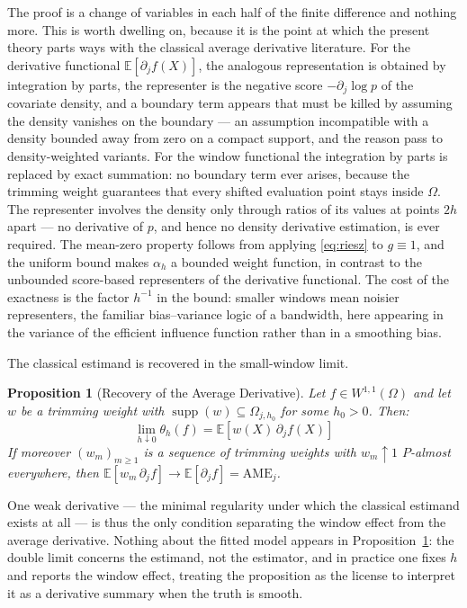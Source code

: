 \documentclass[12pt]{article}
\newtheorem{proposition}{Proposition}
\newcommand{\E}{\mathbb{E}}
\begin{document}
	The proof is a change of variables in each half of the finite difference and nothing
	more. This is worth dwelling on, because it is the point at which the present theory
	parts ways with the classical average derivative literature. For the derivative
	functional $\E[\partial_j f(X)]$, the analogous representation is obtained by
	integration by parts, the representer is the negative score $-\partial_j \log p$ of
	the covariate density, and a boundary term appears that must be killed by assuming
	the density vanishes on the boundary --- an assumption incompatible with a density
	bounded away from zero on a compact support, and the reason
	\citet{powell1989} pass to density-weighted variants. For the window functional the
	integration by parts is replaced by exact summation: no boundary term ever arises,
	because the trimming weight guarantees that every shifted evaluation point stays
	inside $\Omega$. The representer involves the density only through ratios of its
	values at points $2h$ apart --- no derivative of $p$, and hence no density
	derivative estimation, is ever required. The mean-zero property follows from
	applying \eqref{eq:riesz} to $g \equiv 1$, and the uniform bound makes $\alpha_h$ a
	bounded weight function, in contrast to the unbounded score-based representers of
	the derivative functional. The cost of the exactness is the factor $h^{-1}$ in the
	bound: smaller windows mean noisier representers, the familiar bias--variance logic
	of a bandwidth, here appearing in the variance of the efficient influence function
	rather than in a smoothing bias.
	
	The classical estimand is recovered in the small-window limit.
	
	\begin{proposition}[Recovery of the Average Derivative]
		\label{prop:hlimit}
		Let $f \in W^{1,1}(\Omega)$ and let $w$ be a trimming weight with
		$\operatorname{supp}(w) \subseteq \Omega_{j,h_0}$ for some $h_0 > 0$. Then:
		\begin{equation}
			\lim_{h \downarrow 0} \theta_h(f)
			= \E\left[w(X)\, \partial_j f(X)\right]
		\end{equation}
		If moreover $(w_m)_{m \geq 1}$ is a sequence of trimming weights with
		$w_m \uparrow 1$ $P$-almost everywhere, then
		$\E[w_m\, \partial_j f] \to \E[\partial_j f] = \mathrm{AME}_j$.
	\end{proposition}
	
	One weak derivative --- the minimal regularity under which the classical estimand
	exists at all --- is thus the only condition separating the window effect from the
	average derivative. Nothing about the fitted model appears in
	Proposition~\ref{prop:hlimit}: the double limit concerns the estimand, not the
	estimator, and in practice one fixes $h$ and reports the window effect, treating the
	proposition as the license to interpret it as a derivative summary when the truth is
	smooth.
	
\end{document}
